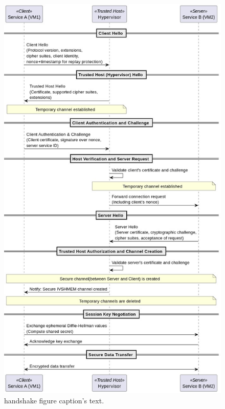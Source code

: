 \documentclass[conference]{IEEEtran}
\begin{document}
\begin{figure}[ht]
\begin{center}
  \includegraphics[width=0.95\linewidth]{./figures/ivshmem_handshake.png}
\end{center}
\caption{\label{fig:handshake} handshake figure 
  caption's text. }
\end{figure}
\end{document}
